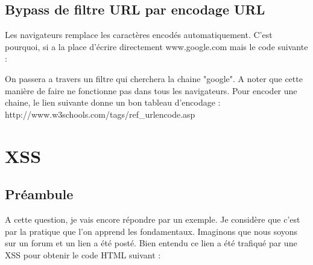 \documentclass{article}
\begin{document}
\subsection{Bypass de filtre URL par encodage URL}

Les navigateurs remplace les caractères encodés automatiquement. C'est pourquoi, si a la place d'écrire directement www.google.com mais le code suivante :
\vspace{0.2cm}\\
\vspace{0.2cm} 

On passera a travers un filtre qui cherchera la chaine "google". A noter que cette manière de faire ne fonctionne pas dans tous les navigateurs. Pour encoder une chaine, le lien suivante donne un bon tableau d'encodage : http://www.w3schools.com/tags/ref\_urlencode.asp

\newpage
\section{XSS}
\subsection{Préambule}
A cette question, je vais encore répondre par un exemple. Je considère que c'est par la pratique que l'on apprend les fondamentaux. Imaginons que nous soyons sur un forum et un lien a été posté. Bien entendu ce lien a été trafiqué par une XSS pour obtenir le code HTML suivant :
\vspace{0.2cm}\\
\vspace{0.2cm}
\end{document}
